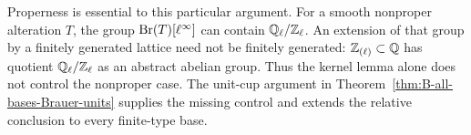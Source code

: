Properness is essential to this particular argument.  For a
smooth nonproper alteration \(T\), the group
\(\operatorname{Br}(T)[\ell^\infty]\) can contain
\(\mathbb Q_\ell/\mathbb Z_\ell\).  An extension of that group by a
finitely generated lattice need not be finitely generated:
\(\mathbb Z_{(\ell)}\subset\mathbb Q\) has quotient
\(\mathbb Q_\ell/\mathbb Z_\ell\) as an abstract abelian group.
Thus the kernel lemma alone does not control the nonproper
case.  The unit-cup argument in
Theorem~\ref{thm:B-all-bases-Brauer-units} supplies the
missing control and extends the relative conclusion to
every finite-type base.

